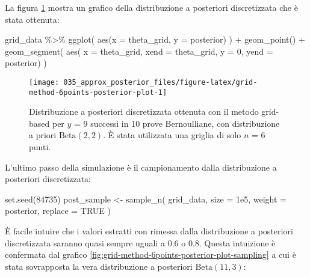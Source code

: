 \documentclass[
]{memoir}
\newenvironment{Shaded}{\begin{snugshade}}{\end{snugshade}}
\newcommand{\AttributeTok}[1]{\textcolor[rgb]{0.77,0.63,0.00}{#1}}
\newcommand{\ConstantTok}[1]{\textcolor[rgb]{0.00,0.00,0.00}{#1}}
\newcommand{\DecValTok}[1]{\textcolor[rgb]{0.00,0.00,0.81}{#1}}
\newcommand{\FloatTok}[1]{\textcolor[rgb]{0.00,0.00,0.81}{#1}}
\newcommand{\FunctionTok}[1]{\textcolor[rgb]{0.00,0.00,0.00}{#1}}
\newcommand{\NormalTok}[1]{#1}
\newcommand{\OtherTok}[1]{\textcolor[rgb]{0.56,0.35,0.01}{#1}}
\newcommand{\SpecialCharTok}[1]{\textcolor[rgb]{0.00,0.00,0.00}{#1}}
\begin{document}
\noindent
La figura \ref{fig:grid-method-6points-posterior-plot} mostra un grafico della distribuzione a posteriori discretizzata che è stata ottenuta:

\begin{Shaded}
\begin{Highlighting}[]
\NormalTok{grid\_data }\SpecialCharTok{\%\textgreater{}\%} 
  \FunctionTok{ggplot}\NormalTok{(}
    \FunctionTok{aes}\NormalTok{(}\AttributeTok{x =}\NormalTok{ theta\_grid, }\AttributeTok{y =}\NormalTok{ posterior)}
\NormalTok{  ) }\SpecialCharTok{+}
  \FunctionTok{geom\_point}\NormalTok{() }\SpecialCharTok{+}
  \FunctionTok{geom\_segment}\NormalTok{(}
    \FunctionTok{aes}\NormalTok{(}
      \AttributeTok{x =}\NormalTok{ theta\_grid, }
      \AttributeTok{xend =}\NormalTok{ theta\_grid, }
      \AttributeTok{y =} \DecValTok{0}\NormalTok{, }
      \AttributeTok{yend =}\NormalTok{ posterior)}
\NormalTok{  )}
\end{Highlighting}
\end{Shaded}

\begin{figure}

{\centering \texttt{[image: 035\_approx\_posterior\_files/figure-latex/grid-method-6points-posterior-plot-1]} 

}

\caption{Distribuzione a posteriori discretizzata ottenuta con il metodo grid-based per $y$ = 9 successi in 10 prove Bernoulliane, con distribuzione a priori $\mbox{Beta}(2, 2)$. È stata utilizzata una griglia di solo $n$ = 6 punti.}\label{fig:grid-method-6points-posterior-plot}
\end{figure}

\noindent
L'ultimo passo della simulazione è il campionamento dalla distribuzione a posteriori discretizzata:

\begin{Shaded}
\begin{Highlighting}[]
\FunctionTok{set.seed}\NormalTok{(}\DecValTok{84735}\NormalTok{)}
\NormalTok{post\_sample }\OtherTok{\textless{}{-}} \FunctionTok{sample\_n}\NormalTok{(}
\NormalTok{  grid\_data,}
  \AttributeTok{size =} \FloatTok{1e5}\NormalTok{,}
  \AttributeTok{weight =}\NormalTok{ posterior,}
  \AttributeTok{replace =} \ConstantTok{TRUE}
\NormalTok{)}
\end{Highlighting}
\end{Shaded}

\noindent
È facile intuire che i valori estratti con rimessa dalla distribuzione a posteriori discretizzata saranno quasi sempre uguali a 0.6 o 0.8. Questa intuizione è confermata dal grafico \ref{fig:grid-method-6points-posterior-plot-sampling} a cui è stata sovrapposta la vera distribuzione a posteriori \(\mbox{Beta}(11, 3)\):
\end{document}
